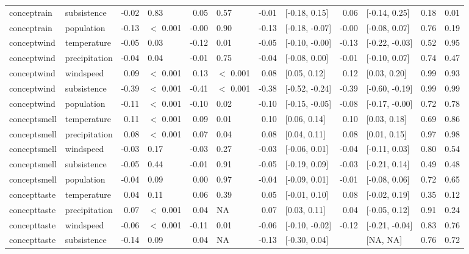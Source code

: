 \begin{table}[ht]
\begin{tabular}{llrlrlrlrlrr}
  conceptrain & subsistence & -0.02 & 0.83 & 0.05 & 0.57 & -0.01 & [-0.18, 0.15] & 0.06 & [-0.14, 0.25] & 0.18 & 0.01 \\ 
  conceptrain & population & -0.13 & $<$ 0.001 & -0.00 & 0.90 & -0.13 & [-0.18, -0.07] & -0.00 & [-0.08, 0.07] & 0.76 & 0.19 \\ 
  conceptwind & temperature & -0.05 & 0.03 & -0.12 & 0.01 & -0.05 & [-0.10, -0.00] & -0.13 & [-0.22, -0.03] & 0.52 & 0.95 \\ 
  conceptwind & precipitation & -0.04 & 0.04 & -0.01 & 0.75 & -0.04 & [-0.08, 0.00] & -0.01 & [-0.10, 0.07] & 0.74 & 0.47 \\ 
  conceptwind & windspeed & 0.09 & $<$ 0.001 & 0.13 & $<$ 0.001 & 0.08 & [0.05, 0.12] & 0.12 & [0.03, 0.20] & 0.99 & 0.93 \\ 
  conceptwind & subsistence & -0.39 & $<$ 0.001 & -0.41 & $<$ 0.001 & -0.38 & [-0.52, -0.24] & -0.39 & [-0.60, -0.19] & 0.99 & 0.99 \\ 
  conceptwind & population & -0.11 & $<$ 0.001 & -0.10 & 0.02 & -0.10 & [-0.15, -0.05] & -0.08 & [-0.17, -0.00] & 0.72 & 0.78 \\ 
  conceptsmell & temperature & 0.11 & $<$ 0.001 & 0.09 & 0.01 & 0.10 & [0.06, 0.14] & 0.10 & [0.03, 0.18] & 0.69 & 0.86 \\ 
  conceptsmell & precipitation & 0.08 & $<$ 0.001 & 0.07 & 0.04 & 0.08 & [0.04, 0.11] & 0.08 & [0.01, 0.15] & 0.97 & 0.98 \\ 
  conceptsmell & windspeed & -0.03 & 0.17 & -0.03 & 0.27 & -0.03 & [-0.06, 0.01] & -0.04 & [-0.11, 0.03] & 0.80 & 0.54 \\ 
  conceptsmell & subsistence & -0.05 & 0.44 & -0.01 & 0.91 & -0.05 & [-0.19, 0.09] & -0.03 & [-0.21, 0.14] & 0.49 & 0.48 \\ 
  conceptsmell & population & -0.04 & 0.09 & 0.00 & 0.97 & -0.04 & [-0.09, 0.01] & -0.01 & [-0.08, 0.06] & 0.72 & 0.65 \\ 
  concepttaste & temperature & 0.04 & 0.11 & 0.06 & 0.39 & 0.05 & [-0.01, 0.10] & 0.08 & [-0.02, 0.19] & 0.35 & 0.12 \\ 
  concepttaste & precipitation & 0.07 & $<$ 0.001 & 0.04 & NA & 0.07 & [0.03, 0.11] & 0.04 & [-0.05, 0.12] & 0.91 & 0.24 \\ 
  concepttaste & windspeed & -0.06 & $<$ 0.001 & -0.11 & 0.01 & -0.06 & [-0.10, -0.02] & -0.12 & [-0.21, -0.04] & 0.83 & 0.76 \\ 
  concepttaste & subsistence & -0.14 & 0.09 & 0.04 & NA & -0.13 & [-0.30, 0.04] &  & [NA, NA] & 0.76 & 0.72 \\ 

\end{tabular}
\end{table}
